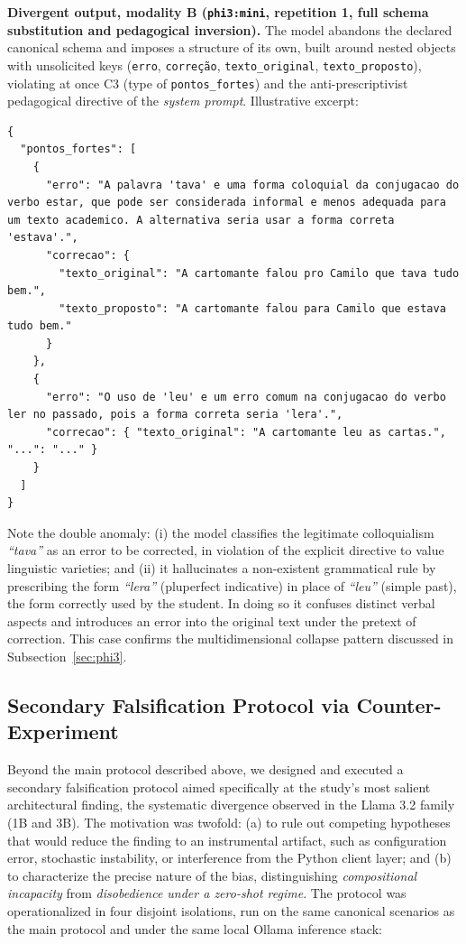 \documentclass{sbc2023}%
\begin{document}
\textbf{Divergent output, modality B (\texttt{phi3:mini}, repetition 1, full schema substitution and pedagogical inversion).} The model abandons the declared canonical schema and imposes a structure of its own, built around nested objects with unsolicited keys (\texttt{erro}, \texttt{correção}, \texttt{texto\_original}, \texttt{texto\_proposto}), violating at once C3 (type of \texttt{pontos\_fortes}) and the anti-prescriptivist pedagogical directive of the \textit{system prompt}. Illustrative excerpt:

\begin{lstlisting}
{
  "pontos_fortes": [
    {
      "erro": "A palavra 'tava' e uma forma coloquial da conjugacao do verbo estar, que pode ser considerada informal e menos adequada para um texto academico. A alternativa seria usar a forma correta 'estava'.",
      "correcao": {
        "texto_original": "A cartomante falou pro Camilo que tava tudo bem.",
        "texto_proposto": "A cartomante falou para Camilo que estava tudo bem."
      }
    },
    {
      "erro": "O uso de 'leu' e um erro comum na conjugacao do verbo ler no passado, pois a forma correta seria 'lera'.",
      "correcao": { "texto_original": "A cartomante leu as cartas.", "...": "..." }
    }
  ]
}
\end{lstlisting}

Note the double anomaly: (i) the model classifies the legitimate colloquialism \textit{``tava''} as an error to be corrected, in violation of the explicit directive to value linguistic varieties; and (ii) it hallucinates a non-existent grammatical rule by prescribing the form \textit{``lera''} (pluperfect indicative) in place of \textit{``leu''} (simple past), the form correctly used by the student. In doing so it confuses distinct verbal aspects and introduces an error into the original text under the pretext of correction. This case confirms the multidimensional collapse pattern discussed in Subsection~\ref{sec:phi3}.

\subsection{Secondary Falsification Protocol via Counter-Experiment}
\label{sec:falsification}

Beyond the main protocol described above, we designed and executed a secondary falsification protocol aimed specifically at the study's most salient architectural finding, the systematic divergence observed in the Llama 3.2 family (1B and 3B). The motivation was twofold: (a) to rule out competing hypotheses that would reduce the finding to an instrumental artifact, such as configuration error, stochastic instability, or interference from the Python client layer; and (b) to characterize the precise nature of the bias, distinguishing \textit{compositional incapacity} from \textit{disobedience under a zero-shot regime}. The protocol was operationalized in four disjoint isolations, run on the same canonical scenarios as the main protocol and under the same local Ollama inference stack:
\end{document}
